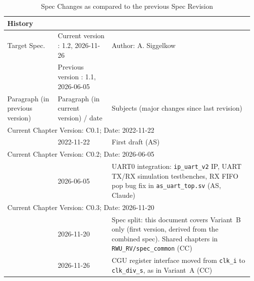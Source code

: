 \begin{table}[H]
\caption{Spec Changes as compared to the previous \aschip \; Spec Revision}
\label{tab:docover_history01}
\centering
\begin{tabularx}{\textwidth}{|X |X |X |}
  \hline
  \multicolumn{3}{|l|}{History} \\
  \hline
  \multicolumn{1}{|l}{Target Spec.} & \multicolumn{1}{l}{Current version : 1.2, 2026-11-26} & \multicolumn{1}{l|}{Author: A. Siggelkow}\\
  \multicolumn{1}{|l}{ } & \multicolumn{1}{l}{Previous version : 1.1, 2026-06-05} & \multicolumn{1}{l|}{ }\\
  \hline
  \hline
  Paragraph (in previous version) & Paragraph (in current version) / date & Subjects (major changes since last revision) \\
  \hline
  \hline
  \multicolumn{3}{|l|}{Current Chapter Version: C0.1; Date: 2022-11-22} \\
  \hline
  & 2022-11-22 & First draft (AS) \\
  \hline
  \multicolumn{3}{|l|}{Current Chapter Version: C0.2; Date: 2026-06-05} \\
  \hline
  & 2026-06-05 & UART0 integration: \texttt{ip\_uart\_v2} IP, UART TX/RX simulation testbenches, RX FIFO pop bug fix in \texttt{as\_uart\_top.sv} (AS, Claude) \\
  \hline
  \multicolumn{3}{|l|}{Current Chapter Version: C0.3; Date: 2026-11-20} \\
  \hline
  & 2026-11-20 & Spec split: this document covers Variant~B only (first version, derived from the combined spec). Shared chapters in \texttt{RWU\_RV/spec\_common} (CC) \\
  \hline
  & 2026-11-26 & CGU register interface moved from \texttt{clk\_i} to \texttt{clk\_div\_s}, as in Variant~A (CC) \\
  \hline
\end{tabularx}
\end{table}
